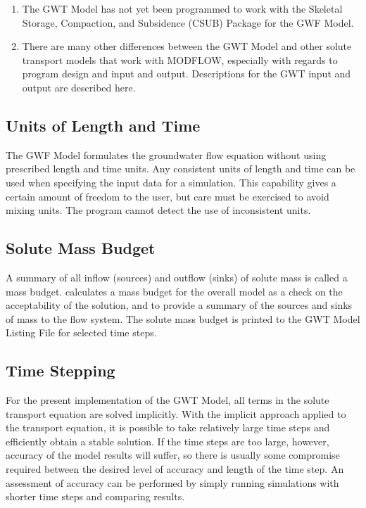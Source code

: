 \begin{enumerate}
\item The GWT Model has not yet been programmed to work with the Skeletal Storage, Compaction, and Subsidence (CSUB) Package for the GWF Model.  

\item There are many other differences between the \mf GWT Model and other solute transport models that work with MODFLOW, especially with regards to program design and input and output.  Descriptions for the GWT input and output are described here.

\end{enumerate}

\subsection{Units of Length and Time}
The GWF Model formulates the groundwater flow equation without using prescribed length and time units. Any consistent units of length and time can be used when specifying the input data for a simulation. This capability gives a certain amount of freedom to the user, but care must be exercised to avoid mixing units.  The program cannot detect the use of inconsistent units.

\subsection{Solute Mass Budget}
A summary of all inflow (sources) and outflow (sinks) of solute mass is called a mass budget.  \mf calculates a mass budget for the overall model as a check on the acceptability of the solution, and to provide a summary of the sources and sinks of mass to the flow system.  The solute mass budget is printed to the GWT Model Listing File for selected time steps.

\subsection{Time Stepping}

For the present implementation of the GWT Model, all terms in the solute transport equation are solved implicitly.  With the implicit approach applied to the transport equation, it is possible to take relatively large time steps and efficiently obtain a stable solution.  If the time steps are too large, however, accuracy of the model results will suffer, so there is usually some compromise required between the desired level of accuracy and length of the time step.  An assessment of accuracy can be performed by simply running simulations with shorter time steps and comparing results.

